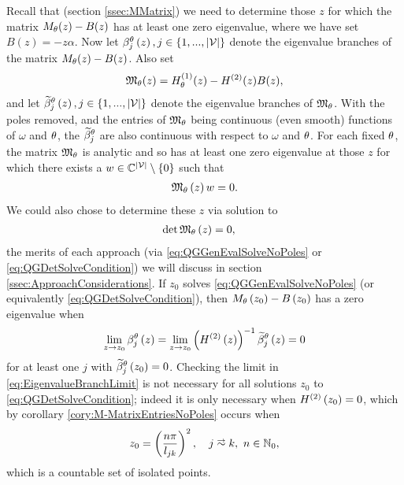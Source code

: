 Recall that (section \ref{ssec:MMatrix}) we need to determine those $z$ for which the matrix $M_\theta(z)-B(z)$ has at least one zero eigenvalue, where we have set $B(z) = -z\alpha$.
Now let $\beta_j^{\theta}\left( z \right), j\in\left\{ 1,...,\left\lvert \mathcal{V} \right\rvert \right\}$ denote the eigenvalue branches of the matrix $M_\theta(z)-B(z)$.
Also set 
\begin{align*}
	\mathfrak{M}_\theta(z) = H^{(1)}_\theta(z) - H^{(2)}(z)B(z),
\end{align*}
and let $\widetilde{\beta}_j^{\theta}\left( z \right), j\in\left\{ 1,...,\left\lvert \mathcal{V} \right\rvert \right\}$ denote the eigenvalue branches of $\mathfrak{M}_\theta$.
With the poles removed, and the entries of $\mathfrak{M}_\theta$ being continuous (even smooth) functions of $\omega$ and $\theta$, the $\widetilde{\beta}_j^{\theta}$ are also continuous with respect to $\omega$ and $\theta$.
For each fixed $\theta$, the matrix $\mathfrak{M}_\theta$ is analytic and so has at least one zero eigenvalue at those $z$ for which there exists a $w\in\mathbb{C}^{\left\lvert \mathcal{V} \right\rvert}\setminus\left\{ 0 \right\}$ such that
\begin{align} \label{eq:QGGenEvalSolveNoPoles}
	\mathfrak{M}_\theta\left( z \right)w = 0.
\end{align}
We could also chose to determine these $z$ via solution to 
\begin{align} \label{eq:QGDetSolveCondition}
	\det\mathfrak{M}_\theta\left( z \right) &= 0,
\end{align}
the merits of each approach (via \eqref{eq:QGGenEvalSolveNoPoles} or \eqref{eq:QGDetSolveCondition}) we will discuss in section \ref{ssec:ApproachConsiderations}.
If $z_0$ solves \eqref{eq:QGGenEvalSolveNoPoles} (or equivalently \eqref{eq:QGDetSolveCondition}), then $M_{\theta}\left( z_0 \right)-B\left( z_0 \right)$ has a zero eigenvalue when
\begin{align} \label{eq:EigenvalueBranchLimit}
	\lim_{z\rightarrow z_0} \beta_j^{\theta}\left( z \right) = \lim_{z\rightarrow z_0} \left(  H^{(2)}\left( z \right)  \right)^{-1} \widetilde{\beta}_j^{\theta}\left( z \right) = 0
\end{align}
for at least one $j$ with $\widetilde{\beta}_j^{\theta}\left( z_0 \right)=0$.
Checking the limit in \eqref{eq:EigenvalueBranchLimit} is not necessary for all solutions $z_0$ to \eqref{eq:QGDetSolveCondition}; indeed it is only necessary when $H^{(2)}\left( z_0 \right) = 0$, which by corollary \ref{cory:M-MatrixEntriesNoPoles} occurs when
\begin{align} \label{eq:H2ZerosEqn}
	z_0 = \bracs{ \frac{n\pi}{l_{jk}} }^2, \quad j\conLeft k, \ n\in\naturals_{0},
\end{align}
which is a countable set of isolated points.
